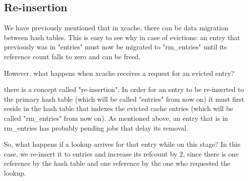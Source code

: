 \subsection{Re-insertion}

We have previously mentioned that in xcache, there can be data migration 
between hash tables. This is easy to see why in case of evictions: an entry 
that previously was in "entries" must now be migrated to "rm\_entries" until 
its reference count falls to zero and can be freed.

However, what happens when xcache receives a request for an evicted entry? 

there is a concept called "re-insertion".  In order for an entry to
be re-inserted to the primary hash table (which will be called "entries" from
now on) it must first reside in the hash table that indexes the evicted cache
entries (which will be called "rm\_entries" from now on). As mentioned above,
an entry that is in rm\_entries has probably pending jobs that delay its
removal.

So, what happens if a lookup arrives for that entry while on this stage? In
this case, we re-insert it to entries and increase its refcount by 2, since
there is one reference by the hash table and one reference by the one who
requested the lookup.

\begin{comment}
\subsection{Hooks}


The hooks that xcache provides to users are:

\begin{itemize}
	\item on\_ init: called on cache entry initialization.
	\item on\_put: called when the last reference to the cache entry is put
	\item on\_evict: called when a cache entry is evicted.
	\item on\_node\_init: called on initial node preparation.
	\item post\_evict: called after an eviction has occurred, with cache  
		lock held.
	\item on\_free: called when a cache entry is freed.
	\item on\_finalize: called to hint the user that the cache entry's ref 
		has dropped to zero.
	\item on\_reinsert: called when a cache entry has been in cache
\end{itemize}

\end{comment}

